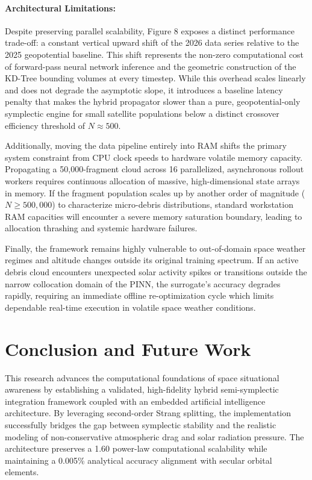 \documentclass[letterpaper, preprint, 11pt]{AAS}
\begin{document}
\paragraph{Architectural Limitations:}
Despite preserving parallel scalability, Figure 8 exposes a distinct performance trade-off: a constant vertical upward shift of the 2026 data series relative to the 2025 geopotential baseline. This shift represents the non-zero computational cost of forward-pass neural network inference and the geometric construction of the KD-Tree bounding volumes at every timestep. While this overhead scales linearly and does not degrade the asymptotic slope, it introduces a baseline latency penalty that makes the hybrid propagator slower than a pure, geopotential-only symplectic engine for small satellite populations below a distinct crossover efficiency threshold of $N \approx 500$.

Additionally, moving the data pipeline entirely into RAM shifts the primary system constraint from CPU clock speeds to hardware volatile memory capacity. Propagating a 50,000-fragment cloud across 16 parallelized, asynchronous rollout workers requires continuous allocation of massive, high-dimensional state arrays in memory. If the fragment population scales up by another order of magnitude ($N \ge 500,000$) to characterize micro-debris distributions, standard workstation RAM capacities will encounter a severe memory saturation boundary, leading to allocation thrashing and systemic hardware failures. 

Finally, the framework remains highly vulnerable to out-of-domain space weather regimes and altitude changes outside its original training spectrum. If an active debris cloud encounters unexpected solar activity spikes or transitions outside the narrow collocation domain of the PINN, the surrogate's accuracy degrades rapidly, requiring an immediate offline re-optimization cycle which limits dependable real-time execution in volatile space weather conditions.

\section{Conclusion and Future Work}

This research advances the computational foundations of space situational awareness by establishing a validated, high-fidelity hybrid semi-symplectic integration framework coupled with an embedded artificial intelligence architecture. By leveraging second-order Strang splitting, the implementation successfully bridges the gap between symplectic stability and the realistic modeling of non-conservative atmospheric drag and solar radiation pressure. The architecture preserves a 1.60 power-law computational scalability while maintaining a 0.005\% analytical accuracy alignment with secular orbital elements.
\end{document}

